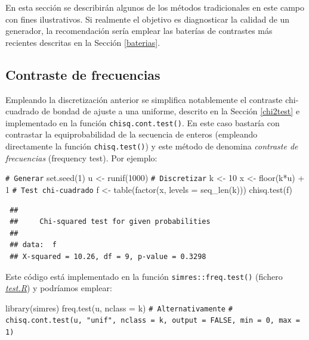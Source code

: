 \documentclass[
]{book}
\newenvironment{Shaded}{\begin{snugshade}}{\end{snugshade}}
\newcommand{\AttributeTok}[1]{\textcolor[rgb]{0.77,0.63,0.00}{#1}}
\newcommand{\CommentTok}[1]{\textcolor[rgb]{0.56,0.35,0.01}{\textit{#1}}}
\newcommand{\DecValTok}[1]{\textcolor[rgb]{0.00,0.00,0.81}{#1}}
\newcommand{\FunctionTok}[1]{\textcolor[rgb]{0.00,0.00,0.00}{#1}}
\newcommand{\NormalTok}[1]{#1}
\newcommand{\OtherTok}[1]{\textcolor[rgb]{0.56,0.35,0.01}{#1}}
\newcommand{\SpecialCharTok}[1]{\textcolor[rgb]{0.00,0.00,0.00}{#1}}
\theoremstyle{break}
\theoremstyle{nonumberplain}
\renewcommand{\CommentTok}[1]{\textcolor[rgb]{0.41,0.41,0.41}{\texttt{#1}}}
\begin{document}
En esta sección se describirán algunos de los métodos tradicionales en este campo con fines ilustrativos. Si realmente el objetivo es diagnosticar la calidad de un generador, la recomendación sería emplear las baterías de contrastes más recientes descritas en la Sección \ref{baterias}.

\hypertarget{freq-test}{%
\subsection{Contraste de frecuencias}\label{freq-test}}

Empleando la discretización anterior se simplifica notablemente el contraste chi-cuadrado de bondad de ajuste a una uniforme, descrito en la Sección \ref{chi2test} e implementado en la función \texttt{chisq.cont.test()}.
En este caso bastaría con contrastar la equiprobabilidad de la secuencia de enteros (empleando directamente la función \texttt{chisq.test()}) y este método de denomina \emph{contraste de frecuencias} (frequency test).
Por ejemplo:

\begin{Shaded}
\begin{Highlighting}[]
\CommentTok{\# Generar}
\FunctionTok{set.seed}\NormalTok{(}\DecValTok{1}\NormalTok{)}
\NormalTok{u }\OtherTok{\textless{}{-}} \FunctionTok{runif}\NormalTok{(}\DecValTok{1000}\NormalTok{)}
\CommentTok{\# Discretizar}
\NormalTok{k }\OtherTok{\textless{}{-}} \DecValTok{10}
\NormalTok{x }\OtherTok{\textless{}{-}} \FunctionTok{floor}\NormalTok{(k}\SpecialCharTok{*}\NormalTok{u) }\SpecialCharTok{+} \DecValTok{1}
\CommentTok{\# Test chi{-}cuadrado}
\NormalTok{f }\OtherTok{\textless{}{-}} \FunctionTok{table}\NormalTok{(}\FunctionTok{factor}\NormalTok{(x, }\AttributeTok{levels =} \FunctionTok{seq\_len}\NormalTok{(k)))}
\FunctionTok{chisq.test}\NormalTok{(f)}
\end{Highlighting}
\end{Shaded}

\begin{verbatim}
 ## 
 ##     Chi-squared test for given probabilities
 ## 
 ## data:  f
 ## X-squared = 10.26, df = 9, p-value = 0.3298
\end{verbatim}

Este código está implementado en la función \texttt{simres::freq.test()} (fichero \href{R/test.R}{\emph{test.R}}) y podríamos emplear:

\begin{Shaded}
\begin{Highlighting}[]
\FunctionTok{library}\NormalTok{(simres)}
\FunctionTok{freq.test}\NormalTok{(u, }\AttributeTok{nclass =}\NormalTok{ k)}
\CommentTok{\# Alternativamente}
\CommentTok{\# chisq.cont.test(u, "unif", nclass = k, output = FALSE, min = 0, max = 1)}
\end{Highlighting}
\end{Shaded}
\end{document}
